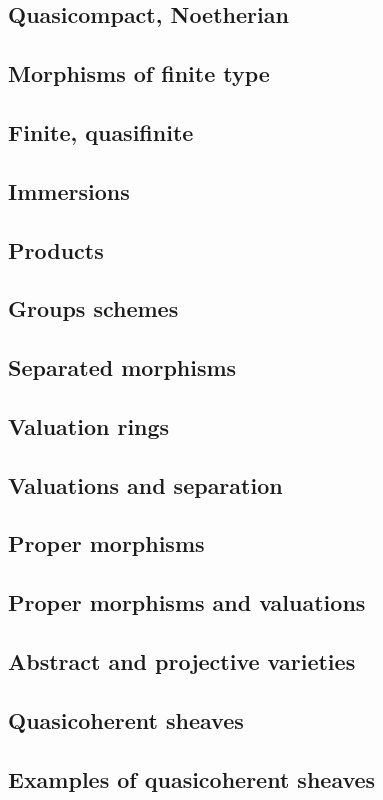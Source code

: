 \documentclass[11pt, oneside,margin=1in]{article}
\begin{document}
\subsection{Quasicompact, Noetherian}
\subsection{Morphisms of finite type}
\subsection{Finite, quasifinite}
\subsection{Immersions}
\subsection{Products}
\subsection{Groups schemes}
\subsection{Separated morphisms}
\subsection{Valuation rings}
\subsection{Valuations and separation}
\subsection{Proper morphisms}
\subsection{Proper morphisms and valuations}
\subsection{Abstract and projective varieties}
\subsection{Quasicoherent sheaves}
\subsection{Examples of quasicoherent sheaves}
\end{document}
